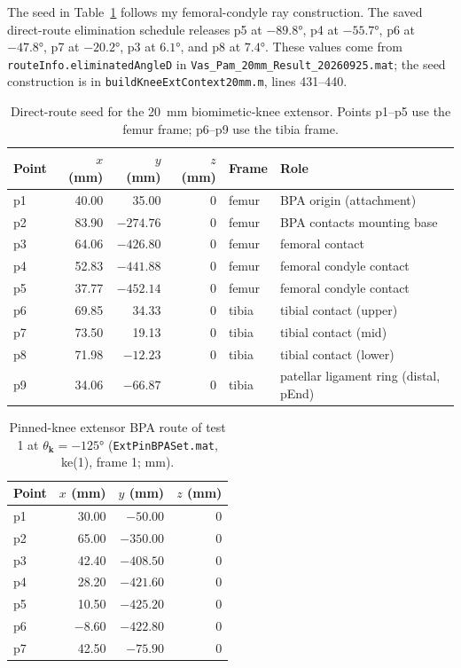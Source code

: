The seed in Table~\ref{tab:app_ext_seed} follows my femoral-condyle ray construction. The saved direct-route elimination schedule releases p5 at $\ang{-89.8}$, p4 at $\ang{-55.7}$, p6 at $\ang{-47.8}$, p7 at $\ang{-20.2}$, p3 at $\ang{+6.1}$, and p8 at $\ang{+7.4}$. These values come from \texttt{routeInfo.eliminatedAngleD} in \nolinkurl{Vas_Pam_20mm_Result_20260925.mat}; the seed construction is in \nolinkurl{buildKneeExtContext20mm.m}, lines 431--440.

\begin{table}
\caption{Direct-route seed for the \qty{20}{\mm} biomimetic-knee extensor. Points p1--p5 use the femur frame; p6--p9 use the tibia frame.}
\label{tab:app_ext_seed}
\begin{tabular}{@{}lrrrll@{}}
\toprule
\textbf{Point} & $x$ (\unit{\mm}) & $y$ (\unit{\mm}) & $z$ (\unit{\mm}) & \textbf{Frame} & \textbf{Role} \\
\midrule
p1 & 40.00 & 35.00  & 0 & femur & BPA origin (attachment) \\
p2 & 83.90 & $-274.76$ & 0 & femur & BPA contacts mounting base \\
p3 & 64.06 & $-426.80$ & 0 & femur & femoral contact \\
p4 & 52.83 & $-441.88$ & 0 & femur & femoral condyle contact \\
p5 & 37.77 & $-452.14$ & 0 & femur & femoral condyle contact \\
p6 & 69.85 & 34.33  & 0 & tibia & tibial contact (upper) \\
p7 & 73.50 & 19.13  & 0 & tibia & tibial contact (mid) \\
p8 & 71.98 & $-12.23$ & 0 & tibia & tibial contact (lower) \\
p9 & 34.06 & $-66.87$ & 0 & tibia & patellar ligament ring (distal, pEnd) \\
\bottomrule
\end{tabular}
\end{table}

\begin{table}[htbp]
\caption{Pinned-knee extensor BPA route of test 1 at $\theta_{\mathbf{k}}=\ang{-125}$ (\nolinkurl{ExtPinBPASet.mat}, ke(1), frame 1; mm).}
\label{tab:app_extpin_route}
\begin{tabular}{@{}lrrr@{}}
\toprule
\textbf{Point} & $x$ (\unit{\mm}) & $y$ (\unit{\mm}) & $z$ (\unit{\mm}) \\
\midrule
p1 & 30.00  & $-50.00$ & 0 \\
p2 & 65.00  & $-350.00$ & 0 \\
p3 & 42.40  & $-408.50$ & 0 \\
p4 & 28.20  & $-421.60$ & 0 \\
p5 & 10.50  & $-425.20$ & 0 \\
p6 & $-8.60$ & $-422.80$ & 0 \\
p7 & 42.50  & $-75.90$ & 0 \\
\bottomrule
\end{tabular}
\end{table}

